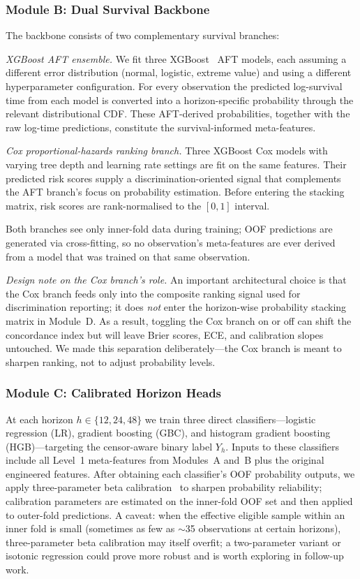 \documentclass[fire,article,submit,pdftex]{../Definitions/mdpi}
\begin{document}
\subsubsection{Module B: Dual Survival Backbone}

The backbone consists of two complementary survival branches:

\emph{XGBoost AFT ensemble.}
We fit three XGBoost~\cite{Chen2016} AFT models, each assuming a different error distribution (normal, logistic, extreme value) and using a different hyperparameter configuration.
For every observation the predicted log-survival time from each model is converted into a horizon-specific probability through the relevant distributional CDF.
These AFT-derived probabilities, together with the raw log-time predictions, constitute the survival-informed meta-features.

\emph{Cox proportional-hazards ranking branch.}
Three XGBoost Cox models with varying tree depth and learning rate settings are fit on the same features.
Their predicted risk scores supply a discrimination-oriented signal that complements the AFT branch's focus on probability estimation.
Before entering the stacking matrix, risk scores are rank-normalised to the $[0, 1]$ interval.

Both branches see only inner-fold data during training; OOF predictions are generated via cross-fitting, so no observation's meta-features are ever derived from a model that was trained on that same observation.

\emph{Design note on the Cox branch's role.}
An important architectural choice is that the Cox branch feeds only into the composite ranking signal used for discrimination reporting; it does \emph{not} enter the horizon-wise probability stacking matrix in Module~D.
As a result, toggling the Cox branch on or off can shift the concordance index but will leave Brier scores, ECE, and calibration slopes untouched.
We made this separation deliberately---the Cox branch is meant to sharpen ranking, not to adjust probability levels.

\subsubsection{Module C: Calibrated Horizon Heads}

At each horizon $h \in \{12, 24, 48\}$ we train three direct classifiers---logistic regression (LR), gradient boosting (GBC), and histogram gradient boosting (HGB)---targeting the censor-aware binary label $Y_h$.
Inputs to these classifiers include all Level~1 meta-features from Modules~A and~B plus the original engineered features.
After obtaining each classifier's OOF probability outputs, we apply three-parameter beta calibration~\cite{Kull2017} to sharpen probability reliability; calibration parameters are estimated on the inner-fold OOF set and then applied to outer-fold predictions.
A caveat: when the effective eligible sample within an inner fold is small (sometimes as few as $\sim$35 observations at certain horizons), three-parameter beta calibration may itself overfit; a two-parameter variant or isotonic regression could prove more robust and is worth exploring in follow-up work.
\end{document}

